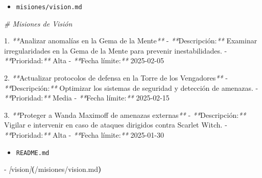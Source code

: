 \documentclass[
]{book}
\newenvironment{Shaded}{\begin{snugshade}}{\end{snugshade}}
\newcommand{\CommentTok}[1]{\textcolor[rgb]{0.56,0.35,0.01}{\textit{#1}}}
\newcommand{\ErrorTok}[1]{\textcolor[rgb]{0.64,0.00,0.00}{\textbf{#1}}}
\newcommand{\ExtensionTok}[1]{#1}
\newcommand{\KeywordTok}[1]{\textcolor[rgb]{0.13,0.29,0.53}{\textbf{#1}}}
\newcommand{\NormalTok}[1]{#1}
\newcommand{\PreprocessorTok}[1]{\textcolor[rgb]{0.56,0.35,0.01}{\textit{#1}}}
\newcommand{\SpecialStringTok}[1]{\textcolor[rgb]{0.31,0.60,0.02}{#1}}
\providecommand{\tightlist}{%
  \setlength{\itemsep}{0pt}\setlength{\parskip}{0pt}}
\begin{document}
\begin{itemize}
\tightlist
\item
  \texttt{misiones/vision.md}
\end{itemize}

\begin{Shaded}
\begin{Highlighting}[]
\CommentTok{\# Misiones de Visión}

\ExtensionTok{1.} \PreprocessorTok{**}\NormalTok{Analizar anomalías en la Gema de la Mente}\PreprocessorTok{**}  
   \ExtensionTok{{-}} \PreprocessorTok{**}\NormalTok{Descripción:}\PreprocessorTok{**}\NormalTok{ Examinar irregularidades en la Gema de la Mente para prevenir inestabilidades.  }
   \ExtensionTok{{-}} \PreprocessorTok{**}\NormalTok{Prioridad:}\PreprocessorTok{**}\NormalTok{ Alta  }
   \ExtensionTok{{-}} \PreprocessorTok{**}\NormalTok{Fecha límite:}\PreprocessorTok{**}\NormalTok{ 2025{-}02{-}05  }

\ExtensionTok{2.} \PreprocessorTok{**}\NormalTok{Actualizar protocolos de defensa en la Torre de los Vengadores}\PreprocessorTok{**}  
   \ExtensionTok{{-}} \PreprocessorTok{**}\NormalTok{Descripción:}\PreprocessorTok{**}\NormalTok{ Optimizar los sistemas de seguridad y detección de amenazas.  }
   \ExtensionTok{{-}} \PreprocessorTok{**}\NormalTok{Prioridad:}\PreprocessorTok{**}\NormalTok{ Media  }
   \ExtensionTok{{-}} \PreprocessorTok{**}\NormalTok{Fecha límite:}\PreprocessorTok{**}\NormalTok{ 2025{-}02{-}15  }

\ExtensionTok{3.} \PreprocessorTok{**}\NormalTok{Proteger a Wanda Maximoff de amenazas externas}\PreprocessorTok{**}  
   \ExtensionTok{{-}} \PreprocessorTok{**}\NormalTok{Descripción:}\PreprocessorTok{**}\NormalTok{ Vigilar e intervenir en caso de ataques dirigidos contra Scarlet Witch.  }
   \ExtensionTok{{-}} \PreprocessorTok{**}\NormalTok{Prioridad:}\PreprocessorTok{**}\NormalTok{ Alta  }
   \ExtensionTok{{-}} \PreprocessorTok{**}\NormalTok{Fecha límite:}\PreprocessorTok{**}\NormalTok{ 2025{-}01{-}30  }
\end{Highlighting}
\end{Shaded}

\begin{itemize}
\tightlist
\item
  \texttt{README.md}
\end{itemize}

\begin{Shaded}
\begin{Highlighting}[]
\ExtensionTok{{-}} \PreprocessorTok{[}\SpecialStringTok{vision}\PreprocessorTok{]}\ErrorTok{(}\ExtensionTok{/misiones/vision.md}\KeywordTok{)}
\end{Highlighting}
\end{Shaded}
\end{document}
